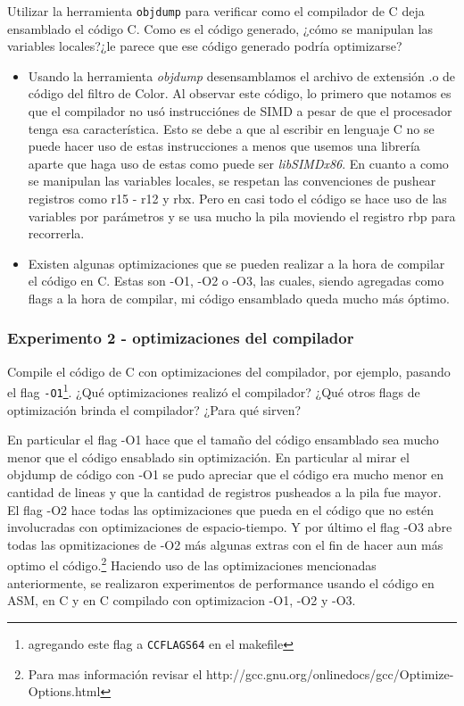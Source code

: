 Utilizar la herramienta \verb|objdump| para verificar como el compilador de C deja ensamblado el código C. Como es el código generado, ¿cómo se manipulan las variables locales?¿le parece que ese código generado podría optimizarse?
\vspace*{0.3cm} \noindent
\begin{itemize}
 \item Usando la herramienta \emph{objdump} desensamblamos el archivo de extensi\'on .o de c\'odigo del filtro de Color. Al observar este c\'odigo, lo primero que notamos es
 que el compilador no us\'o instrucci\'ones de SIMD a pesar de que el procesador tenga esa caracter\'istica. Esto se debe a que al escribir en lenguaje C
no se puede hacer uso de estas instrucciones a menos que usemos una librer\'ia aparte que haga uso de estas como puede ser \emph{libSIMDx86}.\newline
En cuanto a como se manipulan las variables locales, se respetan las convenciones de pushear registros como r15 - r12 y rbx. Pero en casi todo el c\'odigo
se hace uso de las variables por par\'ametros y se usa mucho la pila moviendo el registro rbp para recorrerla.\newline
\item Existen algunas optimizaciones que se pueden realizar a la hora de compilar el c\'odigo en C. Estas son -O1, -O2 o -O3, las cuales, siendo agregadas
como flags a la hora de compilar, mi c\'odigo ensamblado queda mucho m\'as \'optimo. 
\end{itemize}

\vspace*{0.3cm} \noindent
\subsubsection{Experimento 2 - optimizaciones del compilador}

Compile el código de C con optimizaciones del compilador, por ejemplo, pasando el flag \verb|-O1|\footnote{agregando este flag a \texttt{CCFLAGS64} en el makefile}. 
¿Qué optimizaciones realizó el compilador?
¿Qué otros flags de optimización brinda el compilador?
¿Para qué sirven?

\vspace*{0.3cm} \noindent

En particular el flag -O1 hace que el tamaño del c\'odigo ensamblado
sea mucho menor que el c\'odigo ensablado sin optimizaci\'on. En particular al mirar el objdump de c\'odigo con -O1 se pudo apreciar que el c\'odigo era
mucho menor en cantidad de lineas y que la cantidad de registros pusheados a la pila fue mayor.\newline
El flag -O2 hace todas las optimizaciones que pueda en el c\'odigo que no est\'en involucradas con optimizaciones de espacio-tiempo. Y por \'ultimo el flag
-O3 abre todas las opmitizaciones de -O2 m\'as algunas extras con el fin de hacer aun m\'as optimo el c\'odigo.\footnote{Para mas informaci\'on revisar el
http://gcc.gnu.org/onlinedocs/gcc/Optimize-Options.html}\newline
 Haciendo uso de las optimizaciones mencionadas anteriormente, se realizaron experimentos de performance usando el c\'odigo en ASM, en C y en C 
compilado con optimizacion -O1, -O2 y -O3.

